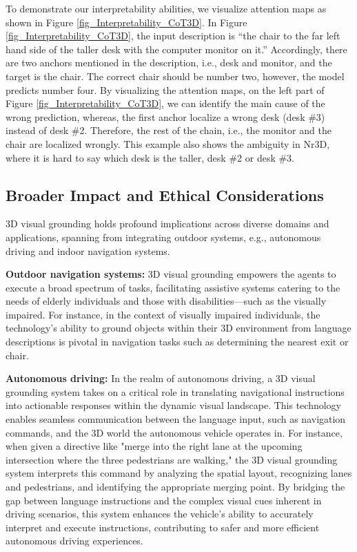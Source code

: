To demonstrate our interpretability abilities, we visualize attention maps as shown in Figure \ref{fig_Interpretability_CoT3D}.
In Figure \ref{fig_Interpretability_CoT3D}, the input description is ``the chair to the far left hand side of the taller desk with the computer monitor on it.''
Accordingly, there are two anchors mentioned in the description, i.e., desk and monitor, and the target is the chair. The correct chair should be number two, however, the model predicts number four. 
By visualizing the attention maps, on the left part of Figure \ref{fig_Interpretability_CoT3D}, we can identify the main cause of the wrong prediction, whereas, the first anchor localize a wrong desk (desk \#3) instead of desk \#2.
Therefore, the rest of the chain, i.e., the monitor and the chair are localized wrongly.
This example also shows the ambiguity in Nr3D, where it is hard to say which desk is the taller, desk \#2 or desk \#3.


\subsection{Broader Impact and Ethical Considerations}
\label{appendix_extended_social_impact}

3D visual grounding holds profound implications across diverse domains and applications, spanning from integrating outdoor systems, e.g., autonomous driving and indoor navigation systems.

\noindent \textbf{Outdoor navigation systems:}
3D visual grounding empowers the agents to execute a broad spectrum of tasks, facilitating assistive systems catering to the needs of elderly individuals and those with disabilities—such as the visually impaired. 
For instance, in the context of visually impaired individuals, the technology's ability to ground objects within their 3D environment from language descriptions is pivotal in navigation tasks such as determining the nearest exit or chair.

\noindent \textbf{Autonomous driving:}
In the realm of autonomous driving, a 3D visual grounding system takes on a critical role in translating navigational instructions into actionable responses within the dynamic visual landscape. 
This technology enables seamless communication between the language input, such as navigation commands, and the 3D world the autonomous vehicle operates in. 
For instance, when given a directive like "merge into the right lane at the upcoming intersection where the three pedestrians are walking," the 3D visual grounding system interprets this command by analyzing the spatial layout, recognizing lanes and pedestrians, and identifying the appropriate merging point. By bridging the gap between language instructions and the complex visual cues inherent in driving scenarios, this system enhances the vehicle's ability to accurately interpret and execute instructions, contributing to safer and more efficient autonomous driving experiences.

